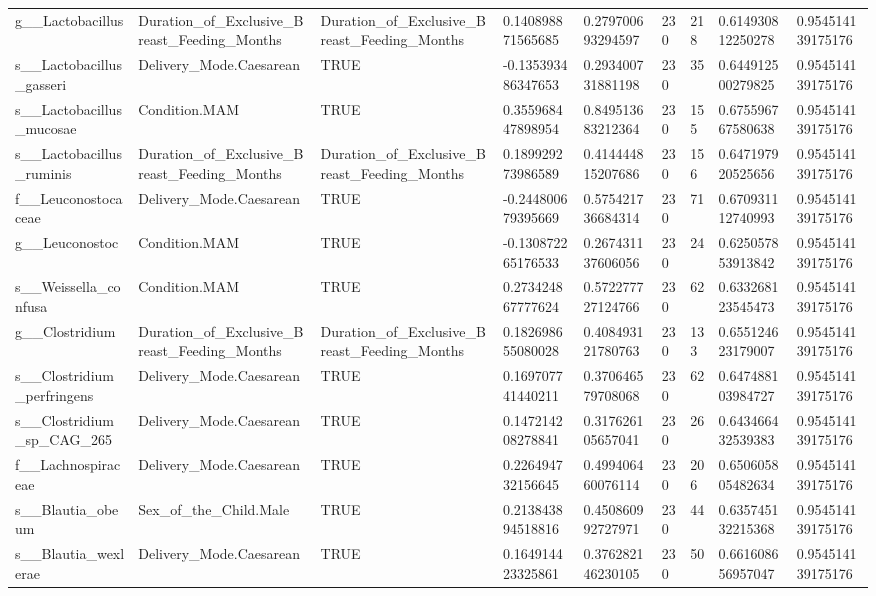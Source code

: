 \begin{longtable}{lllllllll}
g\_\_Lactobacillus & Duration\_of\_Exclusive\_Breast\_Feeding\_Months & Duration\_of\_Exclusive\_Breast\_Feeding\_Months & 0.140898871565685 & 0.279700693294597 & 230 & 218 & 0.614930812250278 & 0.954514139175176 \\
s\_\_Lactobacillus\_gasseri & Delivery\_Mode.Caesarean & TRUE & -0.135393486347653 & 0.293400731881198 & 230 & 35 & 0.644912500279825 & 0.954514139175176 \\
s\_\_Lactobacillus\_mucosae & Condition.MAM & TRUE & 0.355968447898954 & 0.849513683212364 & 230 & 155 & 0.675596767580638 & 0.954514139175176 \\
s\_\_Lactobacillus\_ruminis & Duration\_of\_Exclusive\_Breast\_Feeding\_Months & Duration\_of\_Exclusive\_Breast\_Feeding\_Months & 0.189929273986589 & 0.414444815207686 & 230 & 156 & 0.647197920525656 & 0.954514139175176 \\
f\_\_Leuconostocaceae & Delivery\_Mode.Caesarean & TRUE & -0.244800679395669 & 0.575421736684314 & 230 & 71 & 0.670931112740993 & 0.954514139175176 \\
g\_\_Leuconostoc & Condition.MAM & TRUE & -0.130872265176533 & 0.267431137606056 & 230 & 24 & 0.625057853913842 & 0.954514139175176 \\
s\_\_Weissella\_confusa & Condition.MAM & TRUE & 0.273424867777624 & 0.572277727124766 & 230 & 62 & 0.633268123545473 & 0.954514139175176 \\
g\_\_Clostridium & Duration\_of\_Exclusive\_Breast\_Feeding\_Months & Duration\_of\_Exclusive\_Breast\_Feeding\_Months & 0.182698655080028 & 0.408493121780763 & 230 & 133 & 0.655124623179007 & 0.954514139175176 \\
s\_\_Clostridium\_perfringens & Delivery\_Mode.Caesarean & TRUE & 0.169707741440211 & 0.370646579708068 & 230 & 62 & 0.647488103984727 & 0.954514139175176 \\
s\_\_Clostridium\_sp\_CAG\_265 & Delivery\_Mode.Caesarean & TRUE & 0.147214208278841 & 0.317626105657041 & 230 & 26 & 0.643466432539383 & 0.954514139175176 \\
f\_\_Lachnospiraceae & Delivery\_Mode.Caesarean & TRUE & 0.226494732156645 & 0.499406460076114 & 230 & 206 & 0.650605805482634 & 0.954514139175176 \\
s\_\_Blautia\_obeum & Sex\_of\_the\_Child.Male & TRUE & 0.213843894518816 & 0.450860992727971 & 230 & 44 & 0.635745132215368 & 0.954514139175176 \\
s\_\_Blautia\_wexlerae & Delivery\_Mode.Caesarean & TRUE & 0.164914423325861 & 0.376282146230105 & 230 & 50 & 0.661608656957047 & 0.954514139175176 \\

\end{longtable}
